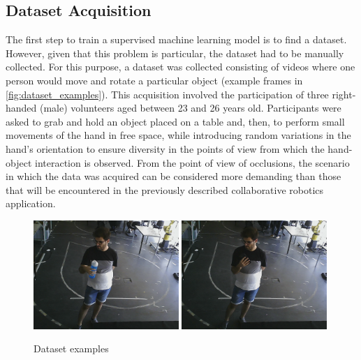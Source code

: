 \subsection{Dataset Acquisition}

The first step to train a supervised machine learning model is to find a dataset. However, given that this problem is particular, the dataset had to be manually collected. For this purpose, a dataset was collected consisting of videos where one person would move and rotate a particular object (example frames in \autoref{fig:dataset_examples}). This acquisition involved the participation of three right-handed (male) volunteers aged between 23 and 26 years old. Participants were asked to grab and hold an object placed on a table and, then, to perform small movements of the hand in free space, while introducing random variations in the hand’s orientation to ensure diversity in the points of view from which the hand-object interaction is observed. From the point of view of occlusions, the scenario in which the data was acquired can be considered more demanding than those that will be encountered in the previously described collaborative robotics application.  

\begin{figure}[ht]
    \centerline{\includegraphics[width=0.49\textwidth]{figs/dataset_preprocessing1_1.png} \includegraphics[width=0.49\textwidth]{figs/dataset_preprocessing1_2.png}}
    \caption{Dataset examples}
    \label{fig:dataset_examples}
\end{figure}

